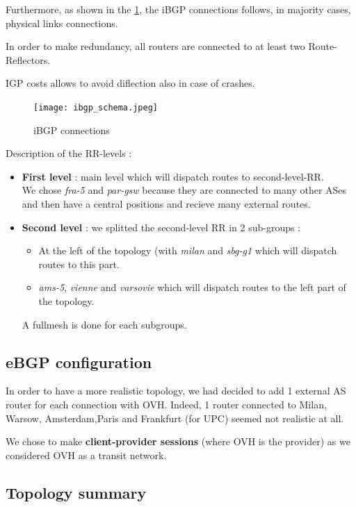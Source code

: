 \documentclass[letter, 9pt, conference]{ieeeconf}
\begin{document}
Furthermore, as shown in the \ref{fig:ibgp_schema}, the iBGP connections follows, in majority cases, physical links connections. 

In order to make redundancy, all routers are connected to at least two Route-Reflectors. 

IGP costs allows to avoid diflection also in case of crashes. 

\begin{figure}[h!]
    \texttt{[image: ibgp\_schema.jpeg]}
    \caption{iBGP connections}
    \label{fig:ibgp_schema}
\end{figure}

Description of the RR-levels : 
\begin{itemize}
    \item \textbf{First level} : main level which will dispatch routes to second-level-RR. \\
    We chose \textit{fra-5} and \textit{par-gsw} because they are connected to many other ASes and then have a central positions and recieve many external routes. 
    \item \textbf{Second level} : we splitted the second-level RR in 2 sub-groups : 
    \begin{itemize}
        \item At the left of the topology (with \textit{milan} and \textit{sbg-g1} which will dispatch routes to this part. 
        \item \textit{ams-5}, \textit{vienne} and \textit{varsovie} which will dispatch routes to the left part of the topology. 
    \end{itemize}
    A fullmesh is done for each subgroups. 
\end{itemize}

\subsection{eBGP configuration}
\label{sec:ebgp}

In order to have a more realistic topology, we had decided to add 1 external AS router for each connection with OVH. Indeed, 1 router connected to Milan, Warsow, Amsterdam,Paris and Frankfurt (for UPC) seemed not realistic at all. 

We chose to make \textbf{client-provider sessions} (where OVH is the provider) as we considered OVH as a transit network. 

\subsection{Topology summary}
\label{sec:summary}
\end{document}
